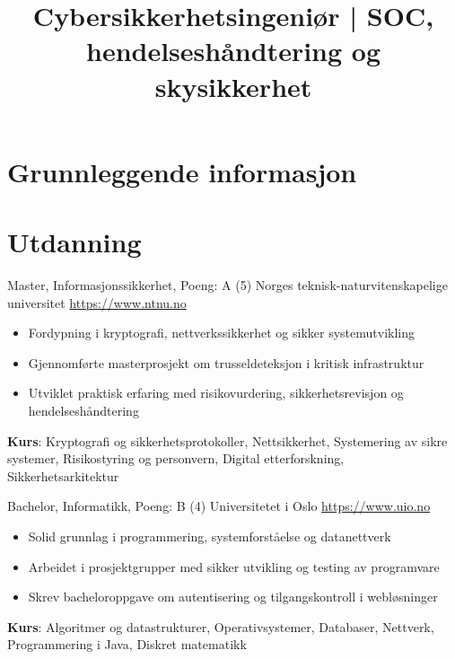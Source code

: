 \documentclass[a4paper, serif, 10pt]{moderncv}
\title{Cybersikkerhetsingeniør | SOC, hendelseshåndtering og skysikkerhet}
\begin{document}
\maketitle

\section{Grunnleggende informasjon}

\section{Utdanning}

        {Master, Informasjonssikkerhet, Poeng: A (5)}
        {Norges teknisk-naturvitenskapelige universitet}
        {\url{https://www.ntnu.no}}
        {}
        {\begin{itemize}
\item Fordypning i kryptografi, nettverkssikkerhet og sikker systemutvikling
\item Gjennomførte masterprosjekt om trusseldeteksjon i kritisk infrastruktur
\item Utviklet praktisk erfaring med risikovurdering, sikkerhetsrevisjon og hendelseshåndtering
\end{itemize}
\textbf{Kurs}: Kryptografi og sikkerhetsprotokoller, Nettsikkerhet, Systemering av sikre systemer, Risikostyring og personvern, Digital etterforskning, Sikkerhetsarkitektur}

        {Bachelor, Informatikk, Poeng: B (4)}
        {Universitetet i Oslo}
        {\url{https://www.uio.no}}
        {}
        {\begin{itemize}
\item Solid grunnlag i programmering, systemforståelse og datanettverk
\item Arbeidet i prosjektgrupper med sikker utvikling og testing av programvare
\item Skrev bacheloroppgave om autentisering og tilgangskontroll i webløsninger
\end{itemize}
\textbf{Kurs}: Algoritmer og datastrukturer, Operativsystemer, Databaser, Nettverk, Programmering i Java, Diskret matematikk}
\end{document}
